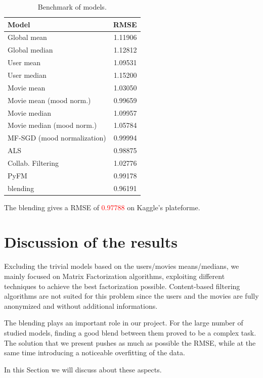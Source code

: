 \documentclass[10pt,conference,compsocconf]{IEEEtran}
\begin{document}
\begin{table}[htbp]
\centering
\begin{tabular}[c]{| l r |}
\hline
Model & RMSE \\
\hline 
\hline
Global mean			& 1.11906 \\
Global median			& 1.12812 \\
User mean			& 1.09531 \\
User median			& 1.15200 \\
Movie mean			& 1.03050 \\
Movie mean (mood norm.)		& 0.99659 \\
Movie median			& 1.09957 \\
Movie median (mood norm.)	& 1.05784 \\
MF-SGD (mood normalization)	& 0.99994 \\
ALS				& 0.98875 \\
Collab. Filtering		& 1.02776 \\
PyFM				& 0.99178 \\ \hline\hline
blending			& 0.96191 \\ 
\hline
\end{tabular}
  \caption{Benchmark of models.}
  \label{benchmark}
\end{table}

The blending gives a RMSE of \textcolor{red}{0.97788} on Kaggle's plateforme. 

\section{Discussion of the results}

Excluding the trivial models based on the users/movies means/medians, we mainly focused on Matrix
Factorization algorithms, exploiting different techniques to achieve the best factorization
possible. Content-based filtering algorithms are not suited for this problem since the users and the
movies are fully anonymized and without additional informations.

The blending plays an important role in our project. For the large number of studied models,
finding a good blend between them proved to be a complex task. The solution that we present pushes
as much as possible the RMSE, while at the same time introducing a noticeable overfitting of the
data.

In this Section we will discuss about these aspects.

\end{document}
